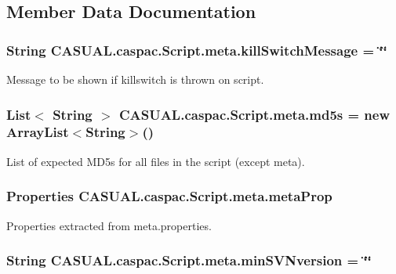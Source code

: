 \subsection{Member Data Documentation}
\hypertarget{class_c_a_s_u_a_l_1_1caspac_1_1_script_1_1meta_a481163a34b5bab4b4695228f4630fdd1}{
\subsubsection[{kill\-Switch\-Message}]{\setlength{\rightskip}{0pt plus 5cm}String C\-A\-S\-U\-A\-L.\-caspac.\-Script.\-meta.\-kill\-Switch\-Message = \char`\"{}\char`\"{}}}\label{class_c_a_s_u_a_l_1_1caspac_1_1_script_1_1meta_a481163a34b5bab4b4695228f4630fdd1}
Message to be shown if killswitch is thrown on script. \hypertarget{class_c_a_s_u_a_l_1_1caspac_1_1_script_1_1meta_af599e29e1ca209e600d5c715544823e1}{
\subsubsection[{md5s}]{\setlength{\rightskip}{0pt plus 5cm}List$<$ String $>$ C\-A\-S\-U\-A\-L.\-caspac.\-Script.\-meta.\-md5s = new Array\-List$<$String$>$()}}\label{class_c_a_s_u_a_l_1_1caspac_1_1_script_1_1meta_af599e29e1ca209e600d5c715544823e1}
List of expected M\-D5s for all files in the script (except meta). \hypertarget{class_c_a_s_u_a_l_1_1caspac_1_1_script_1_1meta_aac6220ea33d812b47fb9bf58ef766fd5}{
\subsubsection[{meta\-Prop}]{\setlength{\rightskip}{0pt plus 5cm}Properties C\-A\-S\-U\-A\-L.\-caspac.\-Script.\-meta.\-meta\-Prop}}\label{class_c_a_s_u_a_l_1_1caspac_1_1_script_1_1meta_aac6220ea33d812b47fb9bf58ef766fd5}
Properties extracted from meta.\-properties. \hypertarget{class_c_a_s_u_a_l_1_1caspac_1_1_script_1_1meta_a5d47eed446b14af2514c6937a4202669}{
\subsubsection[{min\-S\-V\-Nversion}]{\setlength{\rightskip}{0pt plus 5cm}String C\-A\-S\-U\-A\-L.\-caspac.\-Script.\-meta.\-min\-S\-V\-Nversion = \char`\"{}\char`\"{}}}\label{class_c_a_s_u_a_l_1_1caspac_1_1_script_1_1meta_a5d47eed446b14af2514c6937a4202669}
